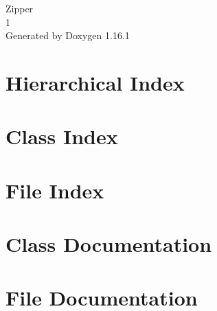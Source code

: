 \documentclass[twoside]{book}
\newcommand{\+}{\discretionary{\mbox{\scriptsize$\hookleftarrow$}}{}{}}
\newcommand{\clearemptydoublepage}{%
    \newpage{\pagestyle{empty}\cleardoublepage}%
  }
\begin{document}
  \raggedbottom
    \hypersetup{pageanchor=false,
                bookmarksnumbered=true,
                pdfencoding=unicode
               }
  \begin{titlepage}
  \vspace*{7cm}
  \begin{center}%
  {\Large Zipper}\\
  [1ex]\large 1 \\
  \vspace*{1cm}
  {\large Generated by Doxygen 1.16.1}\\
  \end{center}
  \end{titlepage}
  \clearemptydoublepage
  \tableofcontents
  \clearemptydoublepage
  \hypersetup{pageanchor=true}

\chapter{Hierarchical Index}

\chapter{Class Index}

\chapter{File Index}

\chapter{Class Documentation}


\chapter{File Documentation}


  \backmatter
  \newpage
  \clearemptydoublepage
  \printindex
\end{document}

